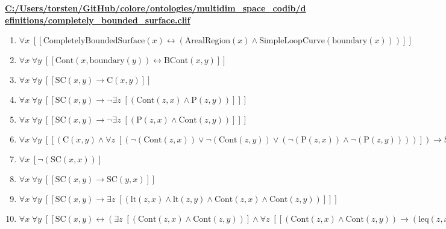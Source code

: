 \documentclass{article}
\begin{document}
\textbf{\url{C:/Users/torsten/GitHub/colore/ontologies/multidim\_space\_codib/definitions/completely\_bounded\_surface.clif}}

\begin{enumerate}
\item $\forall x\;  \left[ \left[ \textrm{CompletelyBoundedSurface}(x) \leftrightarrow \left(\textrm{ArealRegion}(x) \land \textrm{SimpleLoopCurve}(\textrm{boundary}(x))\right) \right] \right]$
\item $\forall x\; \forall y\;  \left[ \left[ \textrm{Cont}(x,\textrm{boundary}(y)) \leftrightarrow \textrm{BCont}(x,y) \right] \right]$
\item $\forall x\; \forall y\;  \left[ \left[ \textrm{SC}(x,y) \rightarrow \textrm{C}(x,y) \right] \right]$
\item $\forall x\; \forall y\;  \left[ \left[ \textrm{SC}(x,y) \rightarrow \neg \exists z\;  \left[ \left(\textrm{Cont}(z,x) \land \textrm{P}(z,y)\right) \right] \right] \right]$
\item $\forall x\; \forall y\;  \left[ \left[ \textrm{SC}(x,y) \rightarrow \neg \exists z\;  \left[ \left(\textrm{P}(z,x) \land \textrm{Cont}(z,y)\right) \right] \right] \right]$
\item $\forall x\; \forall y\;  \left[ \left[ \left(\textrm{C}(x,y) \land \forall z\;  \left[ \left(\neg \left(\textrm{Cont}(z,x)\right) \lor \neg \left(\textrm{Cont}(z,y)\right) \lor \left(\neg \left(\textrm{P}(z,x)\right) \land \neg \left(\textrm{P}(z,y)\right)\right)\right) \right]\right) \rightarrow \textrm{SC}(x,y) \right] \right]$
\item $\forall x\;  \left[ \neg \left(\textrm{SC}(x,x)\right) \right]$
\item $\forall x\; \forall y\;  \left[ \left[ \textrm{SC}(x,y) \rightarrow \textrm{SC}(y,x) \right] \right]$
\item $\forall x\; \forall y\;  \left[ \left[ \textrm{SC}(x,y) \rightarrow \exists z\;  \left[ \left(\textrm{lt}(z,x) \land \textrm{lt}(z,y) \land \textrm{Cont}(z,x) \land \textrm{Cont}(z,y)\right) \right] \right] \right]$
\item $\forall x\; \forall y\;  \left[ \left[ \textrm{SC}(x,y) \leftrightarrow \left(\exists z\;  \left[ \left(\textrm{Cont}(z,x) \land \textrm{Cont}(z,y)\right) \right] \land \forall z\;  \left[ \left[ \left(\textrm{Cont}(z,x) \land \textrm{Cont}(z,y)\right) \rightarrow \left(\textrm{leq}(z,x) \land \neg \left(\textrm{EqDim}(z,x)\right) \land \textrm{leq}(z,y) \land \neg \left(\textrm{EqDim}(z,y)\right)\right) \right] \right]\right) \right] \right]$

\end{enumerate}
\end{document}
